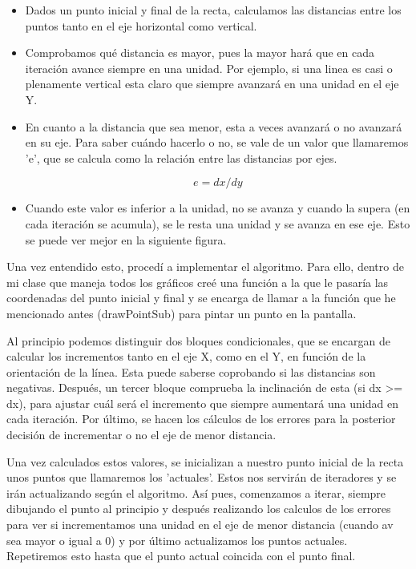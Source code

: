 \begin{itemize}
 \item  Dados un punto inicial y final de la recta, calculamos las distancias entre los puntos tanto en el eje horizontal como vertical.
 \item Comprobamos qué distancia es mayor, pues la mayor hará que en cada iteración avance siempre en una unidad. Por ejemplo, si una linea es casi o plenamente vertical esta claro que siempre avanzará en una unidad en el eje Y.
 \item En cuanto a la distancia que sea menor, esta a veces avanzará o no avanzará en su eje. Para saber cuándo hacerlo o no, se vale de un valor que llamaremos 'e', que se calcula como la relación entre las distancias por ejes.
 
 \begin{equation}
e = dx / dy
\end{equation}

 \item Cuando este valor es inferior a la unidad, no se avanza y cuando la supera (en cada iteración se acumula), se le resta una unidad y se avanza en ese eje. Esto se puede ver mejor en la siguiente figura.

\end{itemize}

\vspace{0.5cm}

Una vez entendido esto, procedí a implementar el algoritmo. Para ello, dentro de mi clase que maneja todos los gráficos creé una función a la que le pasaría las coordenadas del punto inicial y final y se encarga de llamar a la función que he mencionado antes (drawPointSub) para pintar un punto en la pantalla.

\vspace{0.5cm}

Al principio podemos distinguir dos bloques condicionales, que se encargan de calcular los incrementos tanto en el eje X, como en el Y, en función de la orientación de la línea. Esta puede saberse coprobando si las distancias son negativas. Después, un tercer bloque comprueba la inclinación de esta (si dx >= dx), para ajustar cuál será el incremento que siempre aumentará una unidad en cada iteración. Por último, se hacen los cálculos de los errores para la posterior decisión de incrementar o no el eje de menor distancia.

\vspace{0.5cm}

Una vez calculados estos valores, se inicializan a nuestro punto inicial de la recta unos puntos que llamaremos los 'actuales'. Estos nos servirán de iteradores y se irán actualizando según el algoritmo. Así pues, comenzamos a iterar, siempre dibujando el punto al principio y después realizando los calculos de los errores para ver si incrementamos una unidad en el eje de menor distancia (cuando av sea mayor o igual a 0) y por último actualizamos los puntos actuales. Repetiremos esto hasta que el punto actual coincida con el punto final.

